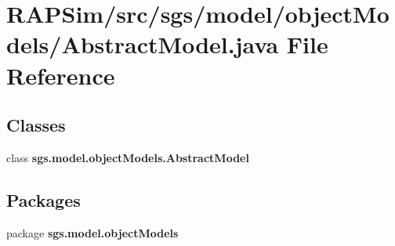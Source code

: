 \section{R\-A\-P\-Sim/src/sgs/model/object\-Models/\-Abstract\-Model.java File Reference}
\label{_abstract_model_8java}
\subsection*{Classes}
\begin{DoxyCompactItemize}
\item 
class {\bf sgs.\-model.\-object\-Models.\-Abstract\-Model}
\end{DoxyCompactItemize}
\subsection*{Packages}
\begin{DoxyCompactItemize}
\item 
package {\bf sgs.\-model.\-object\-Models}
\end{DoxyCompactItemize}
